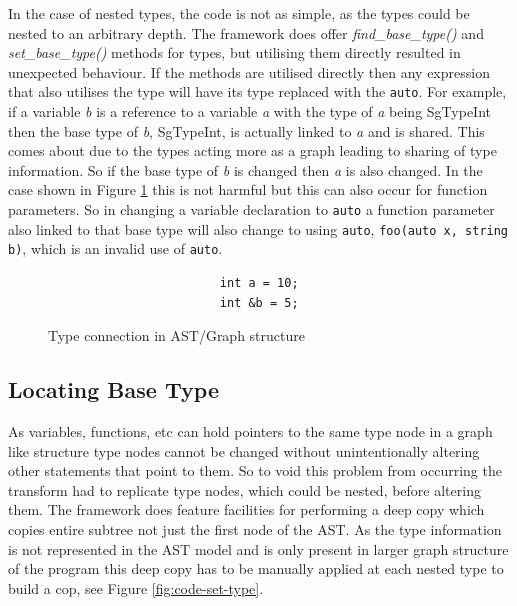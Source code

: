 \documentclass[bsc,frontabs,singlespacing,twoside,parskip,deptreport]{infthesis}
\begin{document}
In the case of nested types, the code is not as simple, as the types could be nested to an arbitrary depth. The framework does offer \textit{find\_base\_type()} and \textit{set\_base\_type()} methods for types, but utilising them directly resulted in unexpected behaviour. If the methods are utilised directly then any expression that also utilises the type will have its type replaced with the \texttt{auto}. For example, if a variable \textit{b} is a reference to a variable \textit{a} with the type of \textit{a} being SgTypeInt then the base type of \textit{b}, SgTypeInt, is actually linked to \textit{a} and is shared. This comes about due to the types acting more as a graph leading to sharing of type information. So if the base type of \textit{b} is changed then \textit{a} is also changed. In the case shown in Figure \ref{fig:type-con-bug} this is not harmful but this can also occur for function parameters. So in changing a variable declaration to \texttt{auto} a function parameter also linked to that base type will also change to using \texttt{auto}, \texttt{foo(auto x, string b)}, which is an invalid use of \texttt{auto}.

\begin{figure}[!h]
    \begin{verbatim}
                        int a = 10;
                        int &b = 5;  
    \end{verbatim}
    \caption{Type connection in AST/Graph structure}
    \centering
    \label{fig:type-con-bug}
\end{figure}

\subsection{Locating Base Type}\label{sec:auto-loc-base-type}


As variables, functions, etc can hold pointers to the same type node in a graph like structure type nodes cannot be changed without unintentionally altering other statements that point to them. So to void this problem from occurring the transform had to replicate type nodes, which could be nested, before altering them. The framework does feature facilities for performing a deep copy which copies entire subtree not just the first node of the AST. As the type information is not represented in the AST model and is only present in larger graph structure of the program this deep copy has to be manually applied at each nested type to build a cop, see Figure \ref{fig:code-set-type}. 
\end{document}
